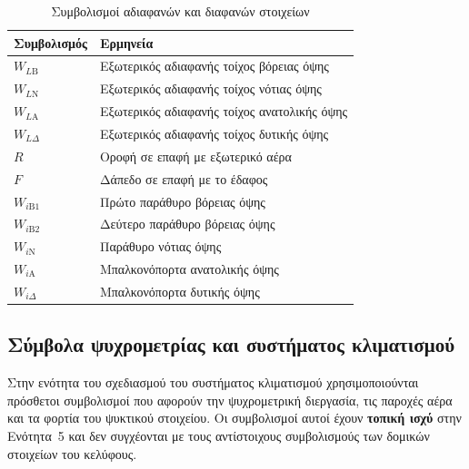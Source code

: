 \documentclass[12pt,a4paper]{article}
\begin{document}
\begin{table}[H]
\centering
\small
\caption{Συμβολισμοί αδιαφανών και διαφανών στοιχείων}
\begin{tabularx}{\textwidth}{C{2.6cm} L}
\toprule
\textbf{Συμβολισμός} & \textbf{Ερμηνεία} \\
\midrule
\(W_{L\mathrm{B}}\) & Εξωτερικός αδιαφανής τοίχος βόρειας όψης \\
\(W_{L\mathrm{N}}\) & Εξωτερικός αδιαφανής τοίχος νότιας όψης \\
\(W_{L\mathrm{A}}\) & Εξωτερικός αδιαφανής τοίχος ανατολικής όψης \\
\(W_{L\Delta}\) & Εξωτερικός αδιαφανής τοίχος δυτικής όψης \\
\(R\) & Οροφή σε επαφή με εξωτερικό αέρα \\
\(F\) & Δάπεδο σε επαφή με το έδαφος \\
\(W_{i\mathrm{B}1}\) & Πρώτο παράθυρο βόρειας όψης \\
\(W_{i\mathrm{B}2}\) & Δεύτερο παράθυρο βόρειας όψης \\
\(W_{i\mathrm{N}}\) & Παράθυρο νότιας όψης \\
\(W_{i\mathrm{A}}\) & Μπαλκονόπορτα ανατολικής όψης \\
\(W_{i\Delta}\) & Μπαλκονόπορτα δυτικής όψης \\
\bottomrule
\end{tabularx}
\end{table}

\subsection{Σύμβολα ψυχρομετρίας και συστήματος κλιματισμού}

Στην ενότητα του σχεδιασμού του συστήματος κλιματισμού χρησιμοποιούνται πρόσθετοι
συμβολισμοί που αφορούν την ψυχρομετρική διεργασία, τις παροχές αέρα και τα φορτία
του ψυκτικού στοιχείου. Οι συμβολισμοί αυτοί έχουν \textbf{τοπική ισχύ} στην
Ενότητα~5 και δεν συγχέονται με τους αντίστοιχους συμβολισμούς των δομικών
στοιχείων του κελύφους.
\end{document}
